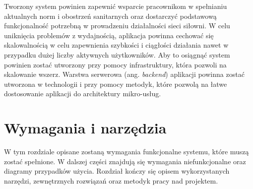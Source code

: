 \documentclass[a4paper,twoside,12pt]{book}
\newcommand{\obcy}[1]{\emph{#1}}
\newcommand{\ang}[1]{{\selectlanguage{british}\obcy{#1}}}
\begin{document}
{Tworzony system powinien zapewnić wsparcie pracownikom w spełnianiu aktualnych norm i obostrzeń sanitarnych oraz dostarczyć podstawową funkcjonalność potrzebną w prowadzeniu działalności sieci siłowni. W celu uniknięcia problemów z wydajnością, aplikacja powinna cechować się skalowalnością w celu zapewnienia szybkości i ciągłości działania nawet w przypadku dużej liczby aktywnych użytkowników. Aby to osiągnąć system powinien zostać utworzony przy pomocy infrastruktury, która pozwoli na skalowanie wszerz. Warstwa serwerowa (ang. \ang{backend}) aplikacji powinna zostać utworzona w technologii i przy pomocy metodyk, które pozwolą na łatwe dostosowanie aplikacji do architektury mikro-usług.

\chapter{Wymagania i narzędzia}
\label{chap:Wymagania}
W tym rozdziale opisane zostaną wymagania funkcjonalne systemu, które muszą zostać spełnione. W dalszej części znajdują się wymagania niefunkcjonalne oraz diagramy przypadków użycia. Rozdział kończy się opisem wykorzystanych narzędzi, zewnętrznych rozwiązań oraz metodyk pracy nad projektem.

}
\end{document}
